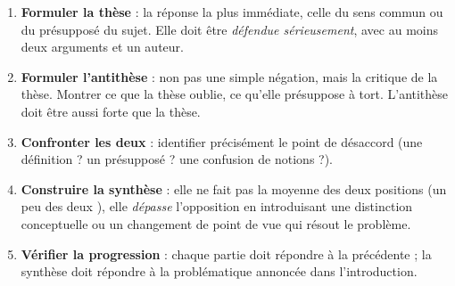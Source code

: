 \documentclass[11pt]{article}
\begin{document}
\begin{methode}
\begin{enumerate}
\item \textbf{Formuler la thèse} : la réponse la plus immédiate, celle du sens commun ou du présupposé du sujet. Elle doit être \emph{défendue sérieusement}, avec au moins deux arguments et un auteur.
\item \textbf{Formuler l'antithèse} : non pas une simple négation, mais la critique de la thèse. Montrer ce que la thèse oublie, ce qu'elle présuppose à tort. L'antithèse doit être aussi forte que la thèse.
\item \textbf{Confronter les deux} : identifier précisément le point de désaccord (une définition ? un présupposé ? une confusion de notions ?).
\item \textbf{Construire la synthèse} : elle ne fait pas la moyenne des deux positions (\guillemotleft un peu des deux \guillemotright), elle \emph{dépasse} l'opposition en introduisant une distinction conceptuelle ou un changement de point de vue qui résout le problème.
\item \textbf{Vérifier la progression} : chaque partie doit répondre à la précédente ; la synthèse doit répondre à la problématique annoncée dans l'introduction.
\end{enumerate}
\end{methode}
\end{document}
